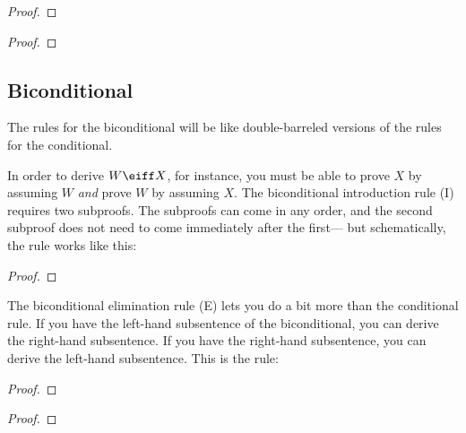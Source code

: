 \label{HSproof}
\begin{proof}
	\open
	\close
\end{proof}

\label{HSproof}
\begin{proof}
	\open
	\close
\end{proof}



\subsection{Biconditional}
The rules for the biconditional will be like double-barreled versions of the rules for the conditional.

In order to derive $W \eiff X$, for instance, you must be able to prove $X$ by assuming $W$ \emph{and} prove $W$ by assuming $X$. The biconditional introduction rule ({\eiff}I) requires two subproofs. The subproofs can come in any order, and the second subproof does not need to come immediately after the first--- but schematically, the rule works like this:

\begin{proof}
	\open
		 
	\close
	\open
		 
	\close
\end{proof}

The biconditional elimination rule ({\eiff}E) lets you do a bit more than the conditional rule. If you have the left-hand subsentence of the biconditional, you can derive the right-hand subsentence. If you have the right-hand subsentence, you can derive the left-hand subsentence. This is the rule:

\begin{multicols}{2}
\begin{proof}
	 
\end{proof}

\begin{proof}
	 
\end{proof}
\end{multicols}




